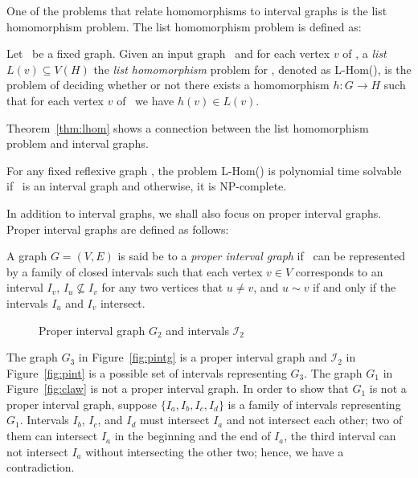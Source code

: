 One of the problems that relate homomorphisms to interval graphs is the list homomorphism problem.
The list homomorphism problem is defined as:

\begin{defi} [L-Hom]
Let \mH\ be a fixed graph. Given an input graph \mG\ and for each vertex \(v\) of \mG,
a \emph{list} \(L(v) \subseteq V(H)\) the \emph{list homomorphism} problem for \mH, denoted
as L-Hom(\mH), is the problem of  deciding whether or not
there exists a homomorphism \(h: G\to H\) such that for each vertex \(v\) of \mG\ 
we have \(h(v)\in L(v)\)\@.
\end{defi}

Theorem~\ref{thm:lhom} shows a connection between the list homomorphism
problem and interval graphs.

\begin{theorem} [Feder and Hell 1996 \cite{listhom}] \label{thm:lhom}
For any fixed reflexive graph \mH, the problem L-Hom(\mH) is polynomial time solvable if
\mH\ is an interval graph and otherwise, it is NP-complete.
\end{theorem}

In addition to interval graphs, we shall also focus on proper interval graphs.
Proper interval graphs are defined as follows:

\begin{defi}
A graph \(G=(V,E)\) is said be to a \emph{proper interval graph} if \mG\ can
be represented by a family of closed intervals such that 
each vertex \(v \in V\) corresponds to an interval \(I_v\), 
\(I_u \not\subseteq I_v\) for any two vertices that \(u \neq v\), and
\(u \sim v\) if and only if the intervals \(I_u\) and \(I_v\) intersect.
\end{defi}

\begin{figure}[h]
\center
\subfigure[\ensuremath{G_3}]{\label{fig:pintg}}\hspace{4cm}
\subfigure[\ensuremath{I_2}]{\label{fig:pint}}%
\caption{Proper interval graph \ensuremath{G_2} and intervals \ensuremath{\mathcal{I}_2}}\label{fig:pintgi}
\end{figure}

The graph \(G_3\) in Figure~\ref{fig:pintg} is a proper interval graph and
\(\mathcal{I}_2\) in Figure~\ref{fig:pint} is a possible set of intervals representing \(G_3\)\@.
The graph \(G_1\) in Figure~\ref{fig:claw} is not a proper interval graph. In order to show that
\(G_1\) is not a proper interval graph, suppose \(\{I_a, I_b, I_c, I_d\}\) is a family of intervals representing \(G_1\)\@.
Intervals \(I_b\), \(I_c\), and \(I_d\) must intersect \(I_a\) and not intersect each other; two of them can intersect \(I_a\)
in the beginning and the end of \(I_a\), the third interval can not intersect \(I_a\) without intersecting the other two; hence, we have a contradiction.


